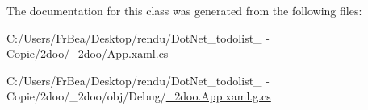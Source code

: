 The documentation for this class was generated from the following files:\begin{CompactItemize}
\item 
C:/Users/FrBea/Desktop/rendu/DotNet\_\-todolist\_ - Copie/2doo/\_\-2doo/\hyperlink{_app_8xaml_8cs}{App.xaml.cs}\item 
C:/Users/FrBea/Desktop/rendu/DotNet\_\-todolist\_ - Copie/2doo/\_\-2doo/obj/Debug/\hyperlink{__2doo_8_app_8xaml_8g_8cs}{\_\-2doo.App.xaml.g.cs}\end{CompactItemize}
